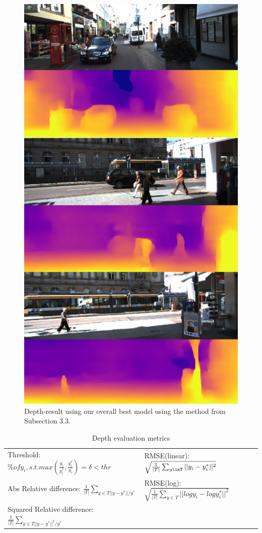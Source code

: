 \documentclass[10pt,twocolumn,letterpaper]{article}
\begin{document}
\begin{figure}[t]
  \includegraphics[width=\columnwidth]{dresult.png}
  \caption{Depth-result using our overall best model using the method from Subsection 3.3.}
  \label{fig:depth_result}
\end{figure}

\begin{table}
\centering
\begin{tabular}{l|l}
 Threshold: $\% of y_i, s.t. max(\frac{y_i}{y_i^*}, \frac{y_i^*}{y_i})=\delta < thr $&  RMSE(linear):$\sqrt{\frac{1}{|T|}\sum_{y\inT}||y_i - y_i^*||^2}$ \\
 Abs Relative difference: $\frac{1}{|T|}\sum_{y\in T||y-y^*||/y^*}$ &  RMSE(log):$\sqrt{\frac{1}{|T|}\sum_{y \in T}||log y_i - log y_i^*||^2}$ \\
 Squared Relative difference:$\frac{1}{|T|}\sum_{y\in T||y-y^*||^2/y^*}$ & 
\end{tabular}
\caption{Depth evaluation metrics}\label{table1:depth_eval}
\end{table}
\end{document}
